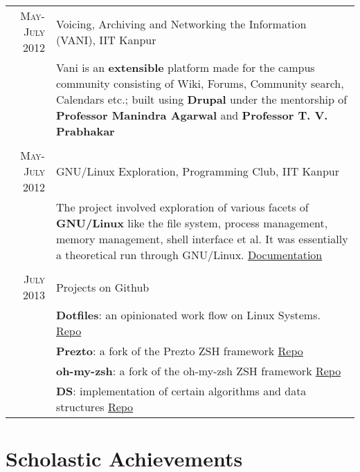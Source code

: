 \documentclass[a4paper,10pt]{article} %
\begin{document}
\begin{tabular}{r|p{11cm}}
    \textsc{May-July 2012} & Voicing, Archiving and Networking the Information \textsc{(VANI)}, IIT Kanpur\\
        & \footnotesize{Vani is an \textbf{extensible} platform made for the campus community consisting of Wiki, Forums,
                Community search, Calendars etc.; built using \textbf{Drupal} under the mentorship of
                \textbf{Professor Manindra Agarwal} and \textbf{Professor T. V. Prabhakar} } \\
            \\

    \textsc{May-July 2012} & GNU/Linux Exploration, Programming Club, IIT Kanpur\\
        & \footnotesize{ The project involved exploration of various facets of \textbf{GNU/Linux} like the file system,
            process management, memory management, shell interface et al.
            It was essentially a theoretical run through GNU/Linux.
            \href{https://docs.google.com/document/d/1ZHO9w36aoq3oaZBR4Um1AOmDfiTDAEgM6baQAu3icw4/edit?usp=sharing} {Documentation} } \\
            \\

    \textsc{July 2013} & Projects on Github \\
                       & \footnotesize{\textbf{Dotfiles}: an opinionated work flow on Linux Systems.
                          \href{https://github.com/srijanshetty/dotfiles} {Repo} } \\
                       & \footnotesize{\textbf{Prezto}: a fork of the Prezto ZSH framework
                          \href{https://github.com/srijanshetty/prezto} {Repo}} \\
                       & \footnotesize {\textbf{oh-my-zsh}: a fork of the oh-my-zsh ZSH framework
                          \href{https://github.com/srijanshetty/oh-my-zsh} {Repo} } \\
                       & \footnotesize{\textbf{DS}: implementation of certain algorithms and data structures
                          \href{https://github.com/srijanshetty/DS} {Repo}} \\

\end{tabular}

\section{Scholastic Achievements}
\end{document}
